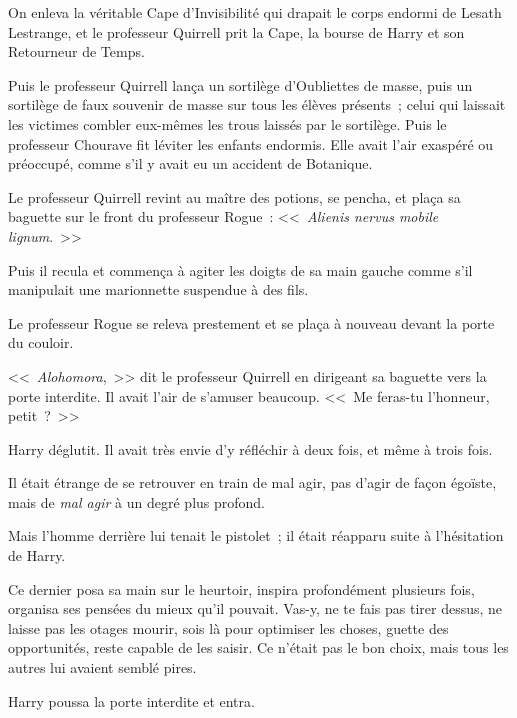 On enleva la véritable Cape d'Invisibilité qui drapait le corps endormi de Lesath Lestrange, et le professeur Quirrell prit la Cape, la bourse de Harry et son Retourneur de Temps.

Puis le professeur Quirrell lança un sortilège d'Oubliettes de masse, puis un sortilège de faux souvenir de masse sur tous les élèves présents~; celui qui laissait les victimes combler eux-mêmes les trous laissés par le sortilège. Puis le professeur Chourave fit léviter les enfants endormis. Elle avait l'air exaspéré ou préoccupé, comme s'il y avait eu un accident de Botanique.

Le professeur Quirrell revint au maître des potions, se pencha, et plaça sa baguette sur le front du professeur Rogue~: <<~\emph{Alienis nervus mobile lignum}.~>>

Puis il recula et commença à agiter les doigts de sa main gauche comme s'il manipulait une marionnette suspendue à des fils.

Le professeur Rogue se releva prestement et se plaça à nouveau devant la porte du couloir.

<<~\emph{Alohomora},~>> dit le professeur Quirrell en dirigeant sa baguette vers la porte interdite. Il avait l'air de s'amuser beaucoup. <<~Me feras-tu l'honneur, petit~?~>>

Harry déglutit. Il avait très envie d'y réfléchir à deux fois, et même à trois fois.

Il était étrange de se retrouver en train de mal agir, pas d'agir de façon égoïste, mais de \emph{mal agir} à un degré plus profond.

Mais l'homme derrière lui tenait le pistolet~; il était réapparu suite à l'hésitation de Harry.

Ce dernier posa sa main sur le heurtoir, inspira profondément plusieurs fois, organisa ses pensées du mieux qu'il pouvait. Vas-y, ne te fais pas tirer dessus, ne laisse pas les otages mourir, sois là pour optimiser les choses, guette des opportunités, reste capable de les saisir. Ce n'était pas le bon choix, mais tous les autres lui avaient semblé pires.

Harry poussa la porte interdite et entra. 

